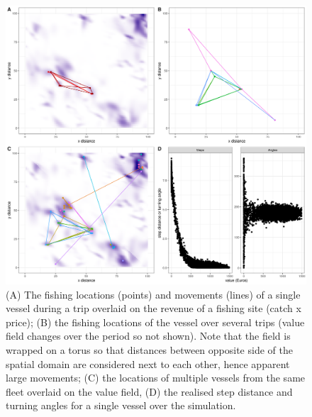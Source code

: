 \documentclass[review]{elsarticle}
\begin{document}
\begin{figure}[!ht]
	\includegraphics[width = \linewidth]{Plots/Combined_Movement}
	\caption{(A) The fishing locations (points) and movements (lines) of a
		single vessel during a trip overlaid on the revenue of a
		fishing site (catch x price); (B) the fishing locations of the
		vessel over several trips (value field changes over the period
		so not shown). Note that the field is wrapped on a torus so
		that distances between opposite side of the spatial domain are
		considered next to each other, hence apparent large movements;
		(C) the locations of multiple vessels from the same fleet
		overlaid on the value field, (D) the realised step distance and
		turning angles for a single vessel over the simulation.}
	\label{fig:mv}
\end{figure}	
\end{document}
